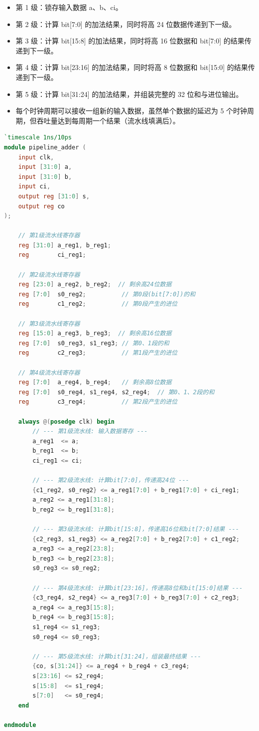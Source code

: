 \documentclass[12pt,a4paper,UTF8]{article}
\begin{document}
\begin{enumerate}
\begin{itemize}
    \item 第 1 级：锁存输入数据 a、b、ci。
    \item 第 2 级：计算 bit[7:0] 的加法结果，同时将高 24 位数据传递到下一级。
    \item 第 3 级：计算 bit[15:8] 的加法结果，同时将高 16 位数据和 bit[7:0] 的结果传递到下一级。
    \item 第 4 级：计算 bit[23:16] 的加法结果，同时将高 8 位数据和 bit[15:0] 的结果传递到下一级。
    \item 第 5 级：计算 bit[31:24] 的加法结果，并组装完整的 32 位和与进位输出。
    \item 每个时钟周期可以接收一组新的输入数据，虽然单个数据的延迟为 5 个时钟周期，但吞吐量达到每周期一个结果（流水线填满后）。
    \end{itemize}
\end{enumerate}

\begin{lstlisting}[language=verilog, caption=32位流水线加法器 Verilog HDL 代码, label=lst:pipeline_adder]
`timescale 1ns/10ps
module pipeline_adder (
    input clk,
    input [31:0] a,
    input [31:0] b,
    input ci,
    output reg [31:0] s,
    output reg co
);

    // 第1级流水线寄存器
    reg [31:0] a_reg1, b_reg1;
    reg        ci_reg1;

    // 第2级流水线寄存器
    reg [23:0] a_reg2, b_reg2;  // 剩余高24位数据
    reg [7:0]  s0_reg2;          // 第0段(bit[7:0])的和
    reg        c1_reg2;          // 第0段产生的进位

    // 第3级流水线寄存器
    reg [15:0] a_reg3, b_reg3;  // 剩余高16位数据
    reg [7:0]  s0_reg3, s1_reg3; // 第0、1段的和
    reg        c2_reg3;          // 第1段产生的进位

    // 第4级流水线寄存器
    reg [7:0]  a_reg4, b_reg4;   // 剩余高8位数据
    reg [7:0]  s0_reg4, s1_reg4, s2_reg4;  // 第0、1、2段的和
    reg        c3_reg4;          // 第2段产生的进位

    always @(posedge clk) begin
        // --- 第1级流水线: 输入数据寄存 ---
        a_reg1  <= a;
        b_reg1  <= b;
        ci_reg1 <= ci;

        // --- 第2级流水线: 计算bit[7:0]，传递高24位 ---
        {c1_reg2, s0_reg2} <= a_reg1[7:0] + b_reg1[7:0] + ci_reg1;
        a_reg2 <= a_reg1[31:8];
        b_reg2 <= b_reg1[31:8];

        // --- 第3级流水线: 计算bit[15:8]，传递高16位和bit[7:0]结果 ---
        {c2_reg3, s1_reg3} <= a_reg2[7:0] + b_reg2[7:0] + c1_reg2;
        a_reg3 <= a_reg2[23:8];
        b_reg3 <= b_reg2[23:8];
        s0_reg3 <= s0_reg2;

        // --- 第4级流水线: 计算bit[23:16]，传递高8位和bit[15:0]结果 ---
        {c3_reg4, s2_reg4} <= a_reg3[7:0] + b_reg3[7:0] + c2_reg3;
        a_reg4 <= a_reg3[15:8];
        b_reg4 <= b_reg3[15:8];
        s1_reg4 <= s1_reg3;
        s0_reg4 <= s0_reg3;

        // --- 第5级流水线: 计算bit[31:24]，组装最终结果 ---
        {co, s[31:24]} <= a_reg4 + b_reg4 + c3_reg4;
        s[23:16] <= s2_reg4;
        s[15:8]  <= s1_reg4;
        s[7:0]   <= s0_reg4;
    end

endmodule
\end{lstlisting}
\end{document}
